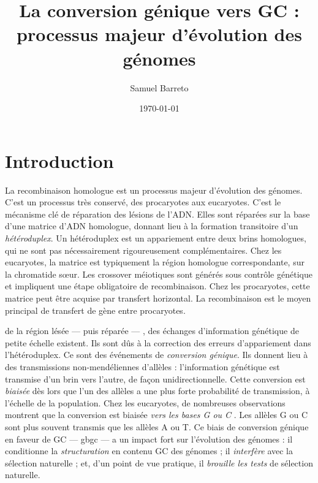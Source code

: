 \documentclass[11pt, oneside]{scrartcl}
\author{Samuel Barreto}
\date{\today}
\title{La conversion génique vers GC : processus majeur d'évolution des génomes}
\begin{document}


\section*{Introduction}
\label{sec:orgheadline1}

La recombinaison homologue est un processus majeur d'évolution des génomes.
C'est un processus très conservé, des procaryotes aux
eucaryotes\cite{cromie_recombination_2001}. C'est le mécanisme clé de réparation
des lésions de l'ADN. Elles sont réparées sur la base d'une matrice d'ADN
homologue, donnant lieu à la formation transitoire d'un \emph{hétéroduplex}. Un
hétéroduplex est un appariement entre deux brins homologues, qui ne sont pas
nécessairement rigoureusement complémentaires. Chez les eucaryotes, la matrice
est typiquement la région homologue correspondante, sur la chromatide sœur. Les
crossover méiotiques sont générés sous contrôle génétique et impliquent une
étape obligatoire de recombinaison\cite{mancera_high-resolution_2008}. Chez les
procaryotes, cette matrice peut être acquise par transfert horizontal. La
recombinaison est le moyen principal de transfert de gène entre procaryotes.

 de la région lésée --- puis réparée --- , des échanges
d'information génétique de petite échelle existent\cite{duret_biased_2009}. Ils
sont dûs à la correction des erreurs d'appariement dans l'hétéroduplex. Ce sont
des événements de \emph{conversion génique}. Ils donnent lieu à des transmissions
non-mendéliennes d'allèles : l'information génétique est transmise d'un brin
vers l'autre, de façon unidirectionnelle. Cette conversion est \emph{biaisée} dès
lors que l'un des allèles a une plus forte probabilité de transmission, à
l'échelle de la population. Chez les eucaryotes, de nombreuses observations
montrent que la conversion est biaisée \emph{vers les bases G ou C}
\cite{pessia_evidence_2012, mancera_high-resolution_2008, duret_impact_2008}.
Les allèles G ou C sont plus souvent transmis que les allèles A ou T. Ce biais
de conversion génique en faveur de GC --- \ac{gbgc} --- a un impact fort sur
l'évolution des génomes : il conditionne la \emph{structuration} en contenu GC des
génomes\cite{duret_impact_2008} ; il \emph{interfère} avec la sélection
naturelle\cite{galtier_gc-biased_2009} ; et, d'un point de vue pratique, il
\emph{brouille les tests} de sélection naturelle\cite{ratnakumar_detecting_2010}.
\end{document}

